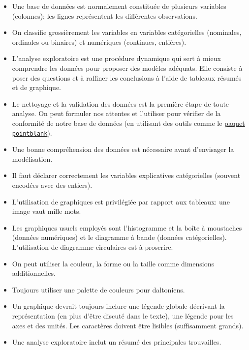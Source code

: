 \documentclass[
  11pt,
  letterpaper,
]{book}
\providecommand{\tightlist}{%
  \setlength{\itemsep}{0pt}\setlength{\parskip}{0pt}}\usepackage{longtable,booktabs,array}
\theoremstyle{definition}
\theoremstyle{remark}
\begin{document}
\begin{tcolorbox}
\begin{itemize}
\tightlist
\item
  Une base de données est normalement constituée de plusieurs variables
  (colonnes); les lignes représentent les différentes observations.
\item
  On classifie grossièrement les variables en variables catégorielles
  (nominales, ordinales ou binaires) et numériques (continues,
  entières).
\item
  L'analyse exploratoire est une procédure dynamique qui sert à mieux
  comprendre les données pour proposer des modèles adéquats. Elle
  consiste à poser des questions et à raffiner les conclusions à l'aide
  de tableaux résumés et de graphique.
\item
  Le nettoyage et la validation des données est la première étape de
  toute analyse. On peut formuler nos attentes et l'utiliser pour
  vérifier de la conformité de notre base de données (en utilisant des
  outils comme le
  \href{https://github.com/rich-iannone/pointblank}{paquet
  \texttt{pointblank}}).
\item
  Une bonne compréhension des données est nécessaire avant d'envisager
  la modélisation.
\item
  Il faut déclarer correctement les variables explicatives catégorielles
  (souvent encodées avec des entiers).
\item
  L'utilisation de graphiques est privilégiée par rapport aux tableaux:
  une image vaut mille mots.
\item
  Les graphiques usuels employés sont l'histogramme et la boîte à
  moustaches (données numériques) et le diagramme à bande (données
  catégorielles). L'utilisation de diagramme circulaires est à
  proscrire.
\item
  On peut utiliser la couleur, la forme ou la taille comme dimensions
  additionnelles.
\item
  Toujours utiliser une palette de couleurs pour daltoniens.
\item
  Un graphique devrait toujours inclure une légende globale décrivant la
  représentation (en plus d'être discuté dans le texte), une légende
  pour les axes et des unités. Les caractères doivent être lisibles
  (suffisamment grands).
\item
  Une analyse exploratoire inclut un résumé des principales trouvailles.
\end{itemize}

\end{tcolorbox}
\end{document}

